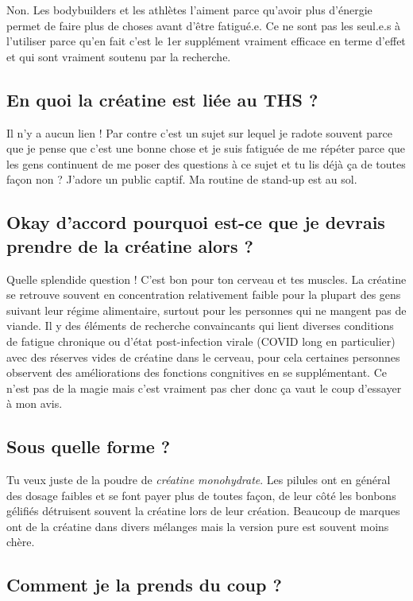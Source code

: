 \documentclass{article}
\begin{document}
Non. Les bodybuilders et les athlètes l'aiment parce qu'avoir plus d'énergie permet de faire plus de choses avant d'être fatigué.e. Ce ne sont pas les seul.e.s à l'utiliser parce qu'en fait c'est le 1er supplément vraiment efficace en terme d'effet et qui sont vraiment soutenu par la recherche.

\subsection{En quoi la créatine est liée au THS ?}

Il n'y a aucun lien ! Par contre c'est un sujet sur lequel je radote souvent parce que je pense que c'est une bonne chose et je suis fatiguée de me répéter parce que les gens continuent de me poser des questions à ce sujet et tu lis déjà ça de toutes façon non ? J'adore un public captif. Ma routine de stand-up est au sol.

\subsection{Okay d'accord pourquoi est-ce que je devrais prendre de la créatine alors ?}

Quelle splendide question ! C'est bon pour ton cerveau et tes muscles. La créatine se retrouve souvent en concentration relativement faible pour la plupart des gens suivant leur régime alimentaire, surtout pour les personnes qui ne mangent pas de viande. Il y des éléments de recherche convaincants qui lient diverses conditions de fatigue chronique ou d'état post-infection virale (COVID long en particulier) avec des réserves vides de créatine dans le cerveau, pour cela certaines personnes observent des améliorations des fonctions congnitives en se supplémentant. Ce n'est pas de la magie mais c'est vraiment pas cher donc ça vaut le coup d'essayer à mon avis.

\subsection{Sous quelle forme ?}

Tu veux juste de la poudre de \textit{créatine monohydrate}. Les pilules ont en général des dosage faibles et se font payer plus de toutes façon, de leur côté les bonbons gélifiés détruisent souvent la créatine lors de leur création. Beaucoup de marques ont de la créatine dans divers mélanges mais la version pure est souvent moins chère.

\subsection{Comment je la prends du coup ?}
\end{document}
